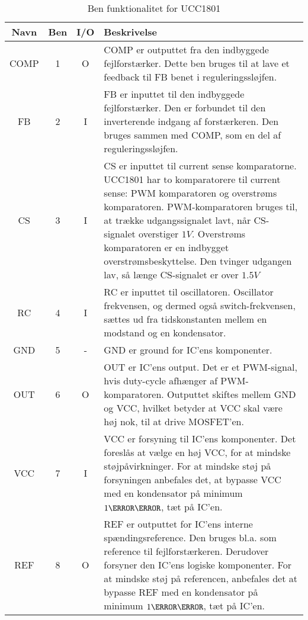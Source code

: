 \begin{table}[H] 			
	\centering
	\begin{tabularx}{\textwidth}{|c|c|c|X|} 
		\hline
		\textbf{Navn} & \textbf{Ben} & \textbf{I/O} & \textbf{Beskrivelse} \\ \hline
		COMP & 1 & O & COMP er outputtet fra den indbyggede fejlforstærker. Dette ben bruges til at lave et feedback til FB benet i reguleringssløjfen. 	\\ \hline
		FB 	 & 2 & I & FB er inputtet til den indbyggede fejlforstærker. Den er forbundet til den inverterende indgang af forstærkeren. Den bruges sammen med COMP, som en del af reguleringssløjfen.\\ \hline
		CS   & 3 & I & CS er inputtet til current sense komparatorne. UCC1801 har to komparatorere til current sense: PWM komparatoren og overstrøms komparatoren. PWM-komparatoren bruges til, at trække udgangssignalet lavt, når CS-signalet overstiger $1V$. Overstrøms komparatoren er en indbygget overstrømsbeskyttelse. Den tvinger udgangen lav, så længe CS-signalet er over $1.5V$ \\ \hline
		RC 	 & 4 & I & RC er inputtet til oscillatoren. Oscillator frekvensen, og dermed også switch-frekvensen, sættes ud fra tidskonstanten mellem en modstand og en kondensator.  \\ \hline
		GND  & 5 & - & GND er ground for IC'ens komponenter.  \\ \hline
		OUT  & 6 & O & OUT er IC'ens output. Det er et PWM-signal, hvis duty-cycle afhænger af PWM-komparatoren. Outputtet skiftes mellem GND og VCC, hvilket betyder at VCC skal være høj nok, til at drive MOSFET'en.  \\ \hline
		VCC  & 7 & I & VCC er forsyning til IC'ens komponenter. Det foreslås at vælge en høj VCC, for at mindske støjpåvirkninger. For at mindske støj på forsyningen anbefales det, at bypasse VCC med en kondensator på minimum $1\micro \farad$, tæt på IC'en. \\ \hline
		REF  & 8 & O & REF er outputtet for IC'ens interne spændingsreference. Den bruges bl.a. som reference til fejlforstærkeren. Derudover forsyner den IC'ens logiske komponenter. For at mindske støj på referencen, anbefales det at bypasse REF med en kondensator på minimum $1\micro \farad$, tæt på IC'en. \\ \hline
	\end{tabularx}
	
	\caption{Ben funktionalitet for UCC1801}
	\label{tab:ucc1801_pin_functionality}
\end{table}

